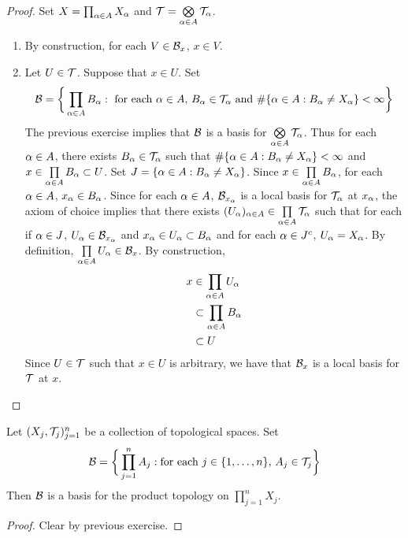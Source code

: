 \documentclass{book}
\begin{document}
	\begin{proof}Set $X = \prod_{\alpha \in A}X_{\alpha}$ and $\mathcal{T} = \bigotimes\limits_{\alpha \in A} \mathcal{T}_{\alpha}$.
		\begin{enumerate}
			\item By construction, for each $V \in \mathcal{B}_x$, $x \in V$. 
			\item Let $U \in \mathcal{T}$. Suppose that $x \in U$. Set 
			$$\mathcal{B} = \bigg \{\prod_{\alpha \in A}B_{\alpha}: \text{ for each $\alpha \in A$,  $B_{\alpha} \in \mathcal{T}_{\alpha}$ and $\# \{\alpha \in A: B_{\alpha} \neq X_{\alpha}\} < \infty$} \bigg\}$$
			The previous exercise implies that $\mathcal{B}$ is a basis for $\bigotimes\limits_{\alpha \in A} \mathcal{T}_{\alpha}$. Thus for each $\alpha \in A$, there exists $B_{\alpha} \in \mathcal{T}_{\alpha}$ such that $\# \{\alpha \in A: B_{\alpha} \neq X_{\alpha}\} < \infty$ and $x \in \prod\limits_{\alpha \in A} B_{\alpha} \subset U$. Set $J = \{\alpha \in A: B_{\alpha} \neq X_{\alpha}\}$. Since $x \in \prod\limits_{\alpha \in A} B_{\alpha}$, for each $\alpha \in A$, $x_{\alpha} \in B_{\alpha}$. Since for each $\alpha \in A$, $\mathcal{B}_{x_{\alpha}}$ is a local basis for $\mathcal{T}_{\alpha}$ at $x_{\alpha}$, the axiom of choice implies that there exists $(U_{\alpha})_{\alpha \in A} \in \prod\limits_{\alpha \in A} \mathcal{T}_{\alpha}$ such that for each if $\alpha \in J$, $U_{\alpha} \in \mathcal{B}_{x_{\alpha}}$ and $x_{\alpha} \in U_{\alpha} \subset B_{\alpha}$ and  for each $\alpha \in J^c$, $U_{\alpha} = X_{\alpha}$. By definition, $\prod\limits_{\alpha \in A} U_{\alpha} \in \mathcal{B}_x$. By construction, 
			\begin{align*}
				x 
				& \in \prod_{\alpha \in A} U_{\alpha} \\
				& \subset \prod_{\alpha \in A} B_{\alpha} \\
				& \subset U
			\end{align*}
			Since $U \in \mathcal{T}$ such that $x \in U$ is arbitrary, we have that $\mathcal{B}_x$ is a local basis for $\mathcal{T}$ at $x$. 
		\end{enumerate}
	\end{proof}

	\begin{ex}  
		Let $(X_j, \mathcal{T}_j)_{j =1}^n$ be a collection of topological spaces. Set 
		$$\mathcal{B} = \bigg \{\prod\limits_{j=1}^n A_j: \text{for each $j \in \{1, \ldots, n\}$, } A_j \in \mathcal{T}_{j} \bigg \}$$ 
		Then $\mathcal{B}$ is a basis for the product topology on $\prod_{j=1}^n X_j$.
	\end{ex}

	\begin{proof}
		Clear by previous exercise.
	\end{proof}
\end{document}
